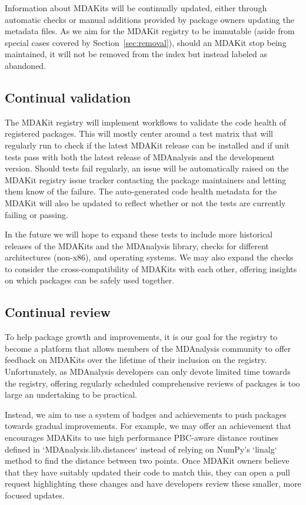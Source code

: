 \documentclass[9pt,whitepaper]{livecoms}
\begin{document}
Information about MDAKits will be continually updated, either through automatic checks or manual additions provided by package owners updating the metadata files. As we aim for the MDAKit registry to be immutable (aside from special cases covered by Section~\ref{sec:removal}), should an MDAKit stop being maintained, it will not be removed from the index but instead labeled as abandoned.

\subsection{Continual validation}
\label{sec:continualvalidation}

The MDAKit registry will implement workflows to validate the code health of registered packages. This will mostly center around a test matrix that will regularly run to check if the latest MDAKit release can be installed and if unit tests pass with both the latest release of MDAnalysis and the development version. Should tests fail regularly, an issue will be automatically raised on the MDAKit registry issue tracker contacting the package maintainers and letting them know of the failure. The auto-generated code health metadata for the MDAKit will also be updated to reflect whether or not the tests are currently failing or passing.

In the future we will hope to expand these tests to include more historical releases of the MDAKits and the MDAnalysis library, checks for different architectures (non-x86), and operating systems. We may also expand the checks to consider the cross-compatibility of MDAKits with each other, offering insights on which packages can be safely used together.

\subsection{Continual review}
\label{sec:continualreview}

To help package growth and improvements, it is our goal for the registry to become a platform that allows members of the MDAnalysis community to offer feedback on MDAKits over the lifetime of their inclusion on the registry. Unfortunately, as MDAnalysis developers can only devote limited time towards the registry, offering regularly scheduled comprehensive reviews of packages is too large an undertaking to be practical.

Instead, we aim to use a system of badges and achievements to push packages towards gradual improvements. For example, we may offer an achievement that encourages MDAKits to use high performance PBC-aware distance routines defined in `MDAnalysis.lib.distances` instead of relying on NumPy’s `linalg` method to find the distance between two points. Once MDAKit owners believe that they have suitably updated their code to match this, they can open a pull request highlighting these changes and have developers review these smaller, more focused updates.
\end{document}
